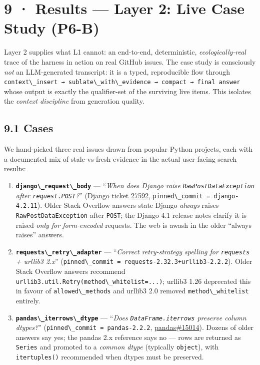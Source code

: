 \section{9 · Results --- Layer 2: Live Case Study (P6-B)}\label{results-layer-2-live-case-study-p6-b}

Layer 2 supplies what L1 cannot: an end-to-end, deterministic, \emph{ecologically-real} trace of the harness in action on real GitHub issues. The case study is consciously \emph{not} an LLM-generated transcript: it is a typed, reproducible flow through \passthrough{\lstinline!context\_insert → sublate\_with\_evidence → compact → final answer!} whose output is exactly the qualifier-set of the surviving live items. This isolates the \emph{context discipline} from generation quality.

\subsection{9.1 Cases}\label{cases}

We hand-picked three real issues drawn from popular Python projects, each with a documented mix of stale-vs-fresh evidence in the actual user-facing search results:

\begin{enumerate}
\def\labelenumi{\arabic{enumi}.}
\item
  \textbf{\passthrough{\lstinline!django\_request\_body!}} --- ``\emph{When does Django raise \passthrough{\lstinline!RawPostDataException!} after \passthrough{\lstinline!request.POST!}?}'' (Django ticket \href{https://code.djangoproject.com/ticket/27592}{27592}, \passthrough{\lstinline!pinned\_commit = django-4.2.11!}). Older Stack Overflow answers state Django \emph{always} raises \passthrough{\lstinline!RawPostDataException!} after \passthrough{\lstinline!POST!}; the Django 4.1 release notes clarify it is raised \emph{only for form-encoded} requests. The web is awash in the older ``always raises'' answers.
\item
  \textbf{\passthrough{\lstinline!requests\_retry\_adapter!}} --- ``\emph{Correct retry-strategy spelling for \passthrough{\lstinline!requests!} + urllib3 2.x}'' (\passthrough{\lstinline!pinned\_commit = requests-2.32.3+urllib3-2.2.2!}). Older Stack Overflow answers recommend \passthrough{\lstinline!urllib3.util.Retry(method\_whitelist=...)!}; urllib3 1.26 deprecated this in favour of \passthrough{\lstinline!allowed\_methods!} and urllib3 2.0 removed \passthrough{\lstinline!method\_whitelist!} entirely.
\item
  \textbf{\passthrough{\lstinline!pandas\_iterrows\_dtype!}} --- ``\emph{Does \passthrough{\lstinline!DataFrame.iterrows!} preserve column dtypes?}'' (\passthrough{\lstinline!pinned\_commit = pandas-2.2.2!}, \href{https://github.com/pandas-dev/pandas/issues/15014}{pandas\#15014}). Dozens of older answers say yes; the pandas 2.x reference says no --- rows are returned as \passthrough{\lstinline!Series!} and promoted to a \emph{common dtype} (typically \passthrough{\lstinline!object!}), with \passthrough{\lstinline!itertuples()!} recommended when dtypes must be preserved.
\end{enumerate}


